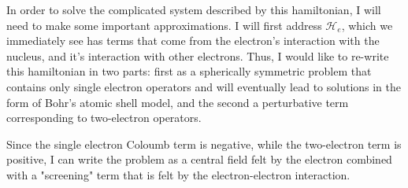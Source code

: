 In order to solve the complicated system described by this hamiltonian, I will need to make some important approximations. I will first address $\mathscr{H}_e$, which we immediately see has terms that come from the electron's interaction with the nucleus, and it's interaction with other electrons. Thus, I would like to re-write this hamiltonian in two parts: first as a spherically symmetric problem that contains only single electron operators and will eventually lead to solutions in the form of Bohr's atomic shell model, and the second a perturbative term corresponding to two-electron operators. 

Since the single electron Coloumb term is negative, while the two-electron term is positive, I can write the problem as a central field felt by the electron combined with a "screening" term that is felt by the electron-electron interaction.


